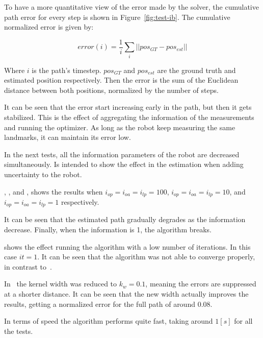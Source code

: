 To have a more quantitative view of the error made by the solver, the cumulative path error for every step is shown in Figure~\ref{fig:test-ib}.  The cumulative normalized error is given by:

\begin{equation}
error (i) = \frac{1}{i} \sum_{i} ||pos_{GT}-pos_{est}||
\end{equation} 

Where $i$ is the path's timestep. $pos_{GT}$ and $pos_{est}$ are the ground truth and estimated position respectively. Then the error is the sum of the Euclidean distance between both positions, normalized by the number of steps. 

It can be seen that the error start increasing early in the path, but then it gets stabilized. This is the effect of aggregating the information of the measurements and running the optimizer. As long as the robot keep measuring the same landmarks, it can maintain its error low. 

In the next tests, all the information parameters of the robot are decreased simultaneously. Is intended to show the effect in the estimation when adding uncertainty to the robot.

, , and , shows the results when $i_{op}=i_{oa}=i_{lp}=100$, $i_{op}=i_{oa}=i_{lp}=10$, and $i_{op}=i_{oa}=i_{lp}=1$ respectively.


It can be seen that the estimated path gradually degrades as the information decrease. Finally, when the information is 1, the algorithm breaks.

 shows the effect running the algorithm with a low number of iterations. In this case $it=1$. It can be seen that the algorithm was not able to converge properly, in contrast to~.

In~ the kernel width was reduced to $k_w=0.1$, meaning the errors are suppressed at a shorter distance. It can be seen that the new width actually improves the results, getting a normalized error for the full path of around 0.08.

In terms of speed the algorithm performs quite fast, taking around $1[s]$ for all the tests.

